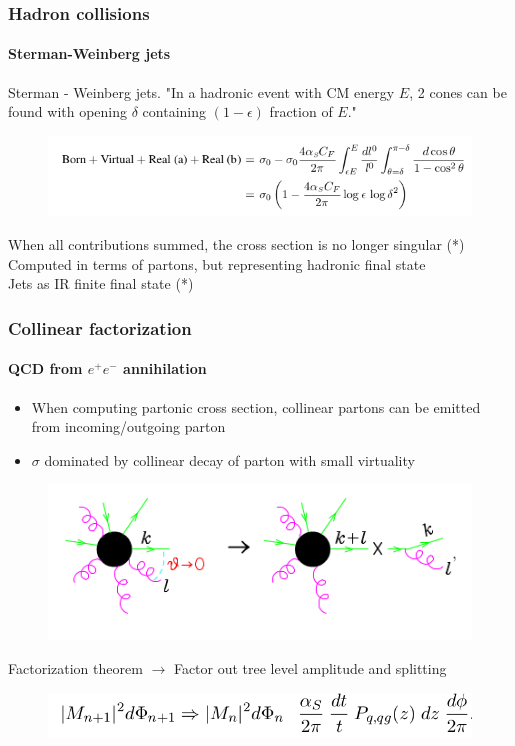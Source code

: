 \documentclass[aspectratio=43]{beamer}
\begin{document}
\begin{frame}

	\frametitle{Hadron collisions}
	\framesubtitle{Sterman-Weinberg jets}
	
	Sterman - Weinberg jets. "In a hadronic event with CM energy $E$, 2 cones can be found with opening $\delta$ containing $(1 - \epsilon)$ fraction of $E$."
	
	\begin{figure}
		\includegraphics[width = 12 cm]{plots/eq_SW_jets.png}
	\end{figure}

	When all contributions summed, the cross section is no longer singular {\color{red}(*)} \\
	Computed in terms of partons, but representing hadronic final state \\
	Jets as IR finite final state {\color{red}(*)}
	
\end{frame}

\begin{frame}


\end{frame}

\begin{frame}

	\frametitle{Collinear factorization}
	\framesubtitle{QCD from $e^{+}e^{-}$ annihilation}
	
	\begin{itemize} 
		\item When computing partonic cross section, collinear partons can be emitted from incoming/outgoing parton
		\item $\sigma$ dominated by collinear decay of parton with small virtuality
	\end{itemize}

	\begin{figure}
		\includegraphics[width = 7 cm]{plots/collinear_factorization.png}
	\end{figure}

	Factorization theorem $\longrightarrow$ Factor out tree level amplitude and splitting
	\begin{figure}
	\includegraphics[width = 8 cm]{plots/eq_factorization_theorem.png}
	\end{figure}
	
\end{frame}
\end{document}

